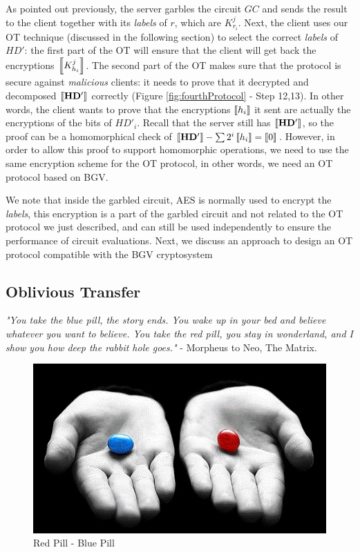 As pointed out previously, the server garbles
the circuit \(GC\) and sends the result to the client together with its
\textit{labels} of \(r\), which are \(K_{r_{i}}^{j}\). Next, the client uses our
OT technique (discussed in the following section) to select the correct
\textit{labels} of \(HD'\): the first part of the OT will ensure that the client
will get back the encryptions \(\left\llbracket K_{h_{i}}^{j}\right\rrbracket\). The second part of the OT
makes sure that the protocol is secure against \textit{malicious} clients: it
needs to prove that it decrypted and decomposed \(\left\llbracket\mathbf{HD'}\right\rrbracket\) correctly
(Figure \ref{fig:fourthProtocol} - Step 12,13). In other words, the client wants
to prove that the encryptions \(\left\llbracket h_{i}\right\rrbracket\) it sent are actually the
encryptions of the bits of \(HD'_{i}\). Recall that the server still has
\(\left\llbracket\mathbf{HD'}\right\rrbracket\), so the proof can be a homomorphical check of
\(\left\llbracket\mathbf{HD'}\right\rrbracket - \sum{2^{i}\left\llbracket h_{i}\right\rrbracket} = \left\llbracket0\right\rrbracket\). However,
in order to allow this proof to support homomorphic operations, we need to use
the same encryption scheme for the OT protocol, in other words, we need an OT
protocol based on BGV.

We note that inside the garbled circuit, AES is normally used to encrypt the
\textit{labels}, this encryption is a part of the garbled circuit and not
related to the OT protocol we just described, and can still be used independently
to ensure the performance of circuit evaluations. Next, we discuss an approach
to design an OT protocol compatible with the BGV cryptosystem

\subsection{Oblivious Transfer}
\label{sec:obliviousTransferPre}

\textit{"You take the blue pill, the story ends. You wake up in your bed and
  believe whatever you want to believe. You take the red pill, you stay in
  wonderland, and I show you how deep the rabbit hole goes."} - Morpheus to Neo,
The Matrix.


\begin{figure}[htbp!] 
\centering    
\includegraphics[width=1.0\textwidth]{Chapter2/Figs/Raster/RedPillBluePill}
\caption[Minion]{Red Pill - Blue Pill}
\label{fig:RedPillBluePill}
\end{figure}

